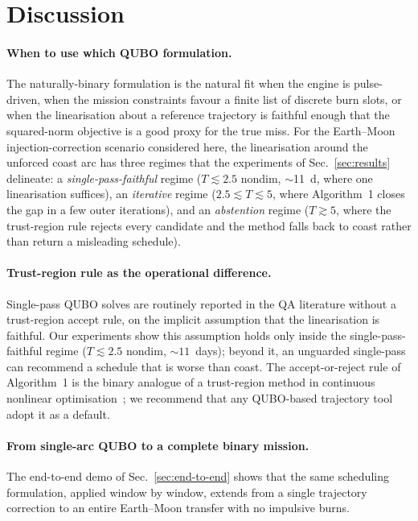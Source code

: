 \documentclass[11pt,a4paper]{article}
\theoremstyle{plain}
\begin{document}
\section{Discussion}\label{sec:discussion}

\paragraph{When to use which QUBO formulation.} The naturally-binary formulation is the
natural fit when the engine is pulse-driven, when the mission
constraints favour a finite list of discrete burn slots, or when
the linearisation about a reference trajectory is faithful enough
that the squared-norm objective is a good proxy for the true miss.
For the Earth--Moon injection-correction scenario considered here,
the linearisation around the unforced coast arc has three regimes
that the experiments of Sec.~\ref{sec:results} delineate: a
\emph{single-pass-faithful} regime ($T \lesssim 2.5$ nondim,
$\sim$\SI{11}{\day}, where one linearisation suffices), an
\emph{iterative} regime ($2.5 \lesssim T \lesssim 5$, where
Algorithm~1 closes the gap in a few outer iterations), and an
\emph{abstention} regime ($T \gtrsim 5$, where the trust-region
rule rejects every candidate and the method falls back to coast
rather than return a misleading schedule).

\paragraph{Trust-region rule as the operational difference.}
Single-pass QUBO solves are routinely reported in the QA literature
without a trust-region accept rule, on the implicit assumption that
the linearisation is faithful. Our experiments show this assumption
holds only inside the single-pass-faithful regime
($T \lesssim 2.5$ nondim, $\sim 11$~days); beyond it, an unguarded
single-pass can recommend a schedule that is worse than coast.
The accept-or-reject rule of Algorithm~1 is the
binary analogue of a trust-region method in continuous nonlinear
optimisation~\cite{Conn2000}; we recommend that any QUBO-based trajectory tool
adopt it as a default.

\paragraph{From single-arc QUBO to a complete binary mission.}
The end-to-end demo of Sec.~\ref{sec:end-to-end} shows that
the same scheduling formulation, applied window by window,
extends from a single trajectory correction to an entire
Earth--Moon transfer with no impulsive burns.
\end{document}
